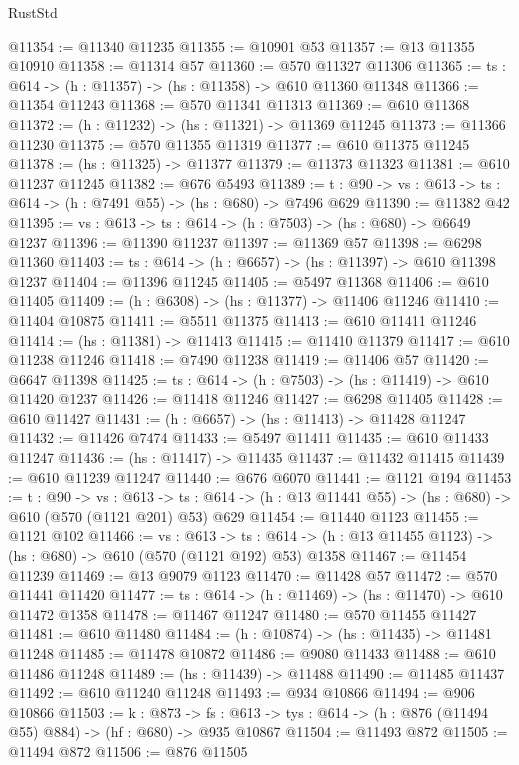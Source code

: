 \begin{lexlean}{RustStd}
\begin{coremodule}
@11354 := @11340 @11235
@11355 := @10901 @53
@11357 := @13 @11355 @10910
@11358 := @11314 @57
@11360 := @570 @11327 @11306
@11365 := {ts : @614} -> (h : @11357) -> (hs : @11358) -> @610 @11360 @11348
@11366 := @11354 @11243
@11368 := @570 @11341 @11313
@11369 := @610 @11368
@11372 := (h : @11232) -> (hs : @11321) -> @11369 @11245
@11373 := @11366 @11230
@11375 := @570 @11355 @11319
@11377 := @610 @11375 @11245
@11378 := (hs : @11325) -> @11377
@11379 := @11373 @11323
@11381 := @610 @11237 @11245
@11382 := @676 @5493
@11389 := {t : @90} -> {vs : @613} -> {ts : @614} -> (h : @7491 @55) -> (hs : @680) -> @7496 @629
@11390 := @11382 @42
@11395 := {vs : @613} -> {ts : @614} -> (h : @7503) -> (hs : @680) -> @6649 @1237
@11396 := @11390 @11237
@11397 := @11369 @57
@11398 := @6298 @11360
@11403 := {ts : @614} -> (h : @6657) -> (hs : @11397) -> @610 @11398 @1237
@11404 := @11396 @11245
@11405 := @5497 @11368
@11406 := @610 @11405
@11409 := (h : @6308) -> (hs : @11377) -> @11406 @11246
@11410 := @11404 @10875
@11411 := @5511 @11375
@11413 := @610 @11411 @11246
@11414 := (hs : @11381) -> @11413
@11415 := @11410 @11379
@11417 := @610 @11238 @11246
@11418 := @7490 @11238
@11419 := @11406 @57
@11420 := @6647 @11398
@11425 := {ts : @614} -> (h : @7503) -> (hs : @11419) -> @610 @11420 @1237
@11426 := @11418 @11246
@11427 := @6298 @11405
@11428 := @610 @11427
@11431 := (h : @6657) -> (hs : @11413) -> @11428 @11247
@11432 := @11426 @7474
@11433 := @5497 @11411
@11435 := @610 @11433 @11247
@11436 := (hs : @11417) -> @11435
@11437 := @11432 @11415
@11439 := @610 @11239 @11247
@11440 := @676 @6070
@11441 := @1121 @194
@11453 := {t : @90} ->
  {vs : @613} ->
  {ts : @614} -> (h : @13 @11441 @55) -> (hs : @680) -> @610 (@570 (@1121 @201) @53) @629
@11454 := @11440 @1123
@11455 := @1121 @102
@11466 := {vs : @613} ->
  {ts : @614} -> (h : @13 @11455 @1123) -> (hs : @680) -> @610 (@570 (@1121 @192) @53) @1358
@11467 := @11454 @11239
@11469 := @13 @9079 @1123
@11470 := @11428 @57
@11472 := @570 @11441 @11420
@11477 := {ts : @614} -> (h : @11469) -> (hs : @11470) -> @610 @11472 @1358
@11478 := @11467 @11247
@11480 := @570 @11455 @11427
@11481 := @610 @11480
@11484 := (h : @10874) -> (hs : @11435) -> @11481 @11248
@11485 := @11478 @10872
@11486 := @9080 @11433
@11488 := @610 @11486 @11248
@11489 := (hs : @11439) -> @11488
@11490 := @11485 @11437
@11492 := @610 @11240 @11248
@11493 := @934 @10866
@11494 := @906 @10866
@11503 := {k : @873} ->
  {fs : @613} -> {tys : @614} -> (h : @876 (@11494 @55) @884) -> (hf : @680) -> @935 @10867
@11504 := @11493 @872
@11505 := @11494 @872
@11506 := @876 @11505

\end{coremodule}
\end{lexlean}

